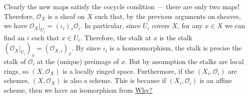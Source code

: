 \documentclass[12pt,letter]{article}
\begin{document}
	Clearly the new maps satisfy the cocycle condition --- there are only two maps! Therefore, $\mathscr O_X$ is a sheaf on $X$ such that, by the previous arguments on sheaves, we have $\mathscr O_X|_{U_i}=\left(\iota_{i}\right)_*\mathscr O_i$. In particular, since $U_i$ covers $X$,  for any $x\in X$ we can find an $i$ such that $x\in U_i$. Therefore, the stalk at $x$ is the stalk $\left(\mathscr O_X|_{U_i}\right)_x=\left(\mathscr O_{X, i}\right)_x$. By since $\iota_i$ is a homeomorphism, the stalk is precise the stalk of $\mathscr O_i$ at the (unique) preimage of $x$. But by assumption the stalks are local rings, so $(X,\mathscr O_X)$ is a locally ringed space. Furthermore, if the $(X_i, \mathscr O_i)$ are schemes, $(X, \mathscr O_X)$ is also a scheme. This is because if $(X_i, \mathscr O_i)$ is an affine scheme, then we have an isomorphism from \textcolor{violet}{\href{https://math.stackexchange.com/questions/4359549/gluing-scheme-is-a-scheme}{Why?}}
\end{document}
